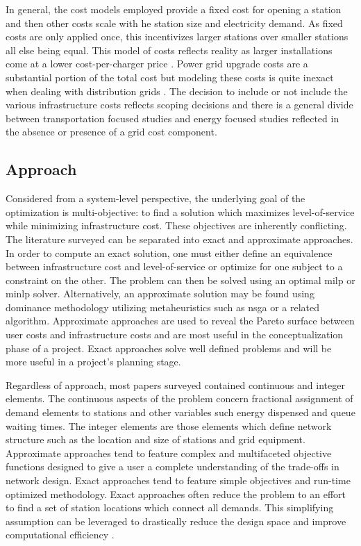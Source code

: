 In general, the cost models employed provide a fixed cost for opening a station and then other costs scale with he station size and electricity demand. As fixed costs are only applied once, this incentivizes larger stations over smaller stations all else being equal. This model of costs reflects reality as larger installations come at a lower cost-per-charger price \citep{Nicholas_2019}. Power grid upgrade costs are a substantial portion of the total cost \citep{Gamage_2023} but modeling these costs is quite inexact when dealing with distribution grids \citep{Li_2024_pnas}. The decision to include or not include the various infrastructure costs reflects scoping decisions and there is a general divide between transportation focused studies and energy focused studies reflected in the absence or presence of a grid cost component.

\subsection{Approach}

Considered from a system-level perspective, the underlying goal of the optimization is multi-objective: to find a solution which maximizes level-of-service while minimizing infrastructure cost. These objectives are inherently conflicting. The literature surveyed can be separated into exact and approximate approaches. In order to compute an exact solution, one must either define an equivalence between infrastructure cost and level-of-service or optimize for one subject to a constraint on the other. The problem can then be solved using an optimal \gls{milp} or \gls{minlp} solver. Alternatively, an approximate solution may be found using dominance methodology utilizing metaheuristics such as \gls{nsga} \citep{Deb_2002_tec} or a related algorithm. Approximate approaches are used to reveal the Pareto surface between user costs and infrastructure costs and are most useful in the conceptualization phase of a project. Exact approaches solve well defined problems and will be more useful in a project's planning stage.

Regardless of approach, most papers surveyed contained continuous and integer elements. The continuous aspects of the problem concern fractional assignment of demand elements to stations and other variables such energy dispensed and queue waiting times. The integer elements are those elements which define network structure such as the location and size of stations and grid equipment. Approximate approaches tend to feature complex and multifaceted objective functions designed to give a user a complete understanding of the trade-offs in network design. Exact approaches tend to feature simple objectives and run-time optimized methodology. Exact approaches often reduce the problem to an effort to find a set of station locations which connect all demands. This simplifying assumption can be leveraged to drastically reduce the design space and improve computational efficiency \cite{Arslan_2019_ts}.


